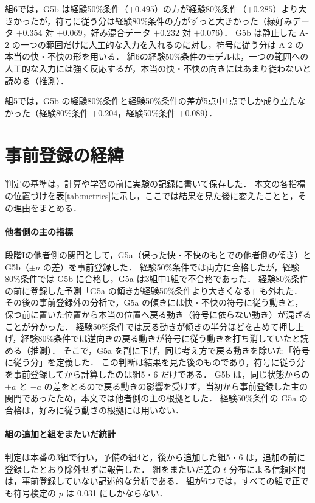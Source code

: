 組6では，G5b は経験50\%条件（$+0.495$）の方が経験80\%条件（$+0.285$）より大きかったが，符号に従う分は経験80\%条件の方がずっと大きかった（緑好みデータ $+0.354$ 対 $+0.069$，好み混合データ $+0.232$ 対 $+0.076$）．
G5b は静止した A-2 の一つの範囲だけに人工的な入力を入れるのに対し，符号に従う分は A-2 の本当の快・不快の形を用いる．
組6の経験50\%条件のモデルは，一つの範囲への人工的な入力には強く反応するが，本当の快・不快の向きにはあまり従わないと読める（推測）．

組5では，G5b の経験80\%条件と経験50\%条件の差が5点中1点でしか成り立たなかった（経験80\%条件 $+0.204$，経験50\%条件 $+0.089$）．

\section{事前登録の経緯}\label{app:prereg}
判定の基準は，計算や学習の前に実験の記録に書いて保存した．
本文の各指標の位置づけを表\ref{tab:metrics}に示し，ここでは結果を見た後に変えたことと，その理由をまとめる．

\paragraph{他者側の主の指標}
段階Iの他者側の関門として，G5a（保った快・不快のもとでの他者側の傾き）と G5b（$\pm a$ の差）を事前登録した．
経験50\%条件では両方に合格したが，経験80\%条件では G5b に合格し，G5a は3組中1組で不合格であった．
経験80\%条件の前に登録した予測「G5a の傾きが経験50\%条件より大きくなる」も外れた．
その後の事前登録外の分析で，G5a の傾きには快・不快の符号に従う動きと，保つ前に置いた位置から本当の位置へ戻る動き（符号に依らない動き）が混ざることが分かった．
経験50\%条件では戻る動きが傾きの半分ほどを占めて押し上げ，経験80\%条件では逆向きの戻る動きが符号に従う動きを打ち消していたと読める（推測）．
そこで，G5a を副に下げ，同じ考え方で戻る動きを除いた「符号に従う分」を定義した．
この判断は結果を見た後のものであり，符号に従う分を事前登録してから計算したのは組5・6 だけである．
G5b は，同じ状態からの $+a$ と $-a$ の差をとるので戻る動きの影響を受けず，当初から事前登録した主の関門であったため，本文では他者側の主の根拠とした．
経験50\%条件の G5a の合格は，好みに従う動きの根拠には用いない．

\paragraph{組の追加と組をまたいだ統計}
判定は本番の3組で行い，予備の組4と，後から追加した組5・6 は，追加の前に登録したとおり除外せずに報告した．
組をまたいだ差の $t$ 分布による信頼区間は，事前登録していない記述的な分析である．
組が6つでは，すべての組で正でも符号検定の $p$ は 0.031 にしかならない．

